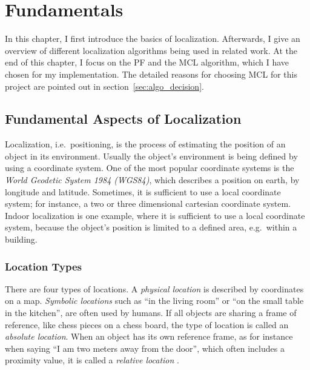 \chapter{Fundamentals}\label{chap:fundamentals}

In this chapter, I first introduce the basics of localization. Afterwards, I give an overview of different localization algorithms being used in related work. At the end of this chapter, I focus on the \acl{PF} and the \acl{MCL} algorithm, which I have chosen for my implementation. The detailed reasons for choosing \acs{MCL} for this project are pointed out in section~\ref{sec:algo_decision}.

\section{Fundamental Aspects of Localization}\label{sec:fund_loc}

Localization, i.e.\ positioning, is the process of estimating the position of an object in its environment. Usually the object's environment is being defined by using a coordinate system. One of the most popular coordinate systems is the \emph{World Geodetic System 1984 (WGS84)}, which describes a position on earth, by longitude and latitude. Sometimes, it is sufficient to use a local coordinate system; for instance, a two or three dimensional cartesian coordinate system. Indoor localization is one example, where it is sufficient to use a local coordinate system, because the object's position is limited to a defined area, e.g.\ within a building.

\subsection{Location Types}
There are four types of locations. A \emph{physical location} is described by coordinates on a map. \emph{Symbolic locations} such as ``in the living room'' or ``on the small table in the kitchen'', are often used by humans. If all objects are sharing a frame of reference, like chess pieces on a chess board, the type of location is called an \emph{absolute location}. When an object has its own reference frame, as for instance when saying ``I am two meters away from the door'', which often includes a proximity value, it is called a \emph{relative location} \citep{IEEE:survey_wireless_indoor_pos}.

